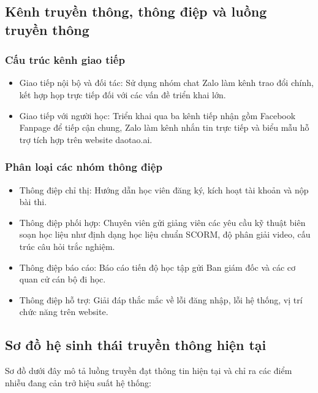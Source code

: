 \subsection{Kênh truyền thông, thông điệp và luồng truyền thông}

\subsubsection{Cấu trúc kênh giao tiếp}
\begin{itemize}
    \item Giao tiếp nội bộ và đối tác: Sử dụng nhóm chat Zalo làm kênh trao đổi chính, kết hợp họp trực tiếp đối với các vấn đề triển khai lớn.
    \item Giao tiếp với người học: Triển khai qua ba kênh tiếp nhận gồm Facebook Fanpage để tiếp cận chung, Zalo làm kênh nhắn tin trực tiếp và biểu mẫu hỗ trợ tích hợp trên website daotao.ai.
\end{itemize}

\subsubsection{Phân loại các nhóm thông điệp}
\begin{itemize}
    \item Thông điệp chỉ thị: Hướng dẫn học viên đăng ký, kích hoạt tài khoản và nộp bài thi.
    \item Thông điệp phối hợp: Chuyên viên gửi giảng viên các yêu cầu kỹ thuật biên soạn học liệu như định dạng học liệu chuẩn SCORM, độ phân giải video, cấu trúc câu hỏi trắc nghiệm.
    \item Thông điệp báo cáo: Báo cáo tiến độ học tập gửi Ban giám đốc và các cơ quan cử cán bộ đi học.
    \item Thông điệp hỗ trợ: Giải đáp thắc mắc về lỗi đăng nhập, lỗi hệ thống, vị trí chức năng trên website.
\end{itemize}

\subsection{Sơ đồ hệ sinh thái truyền thông hiện tại}

Sơ đồ dưới đây mô tả luồng truyền đạt thông tin hiện tại và chỉ ra các điểm nhiễu đang cản trở hiệu suất hệ thống:

